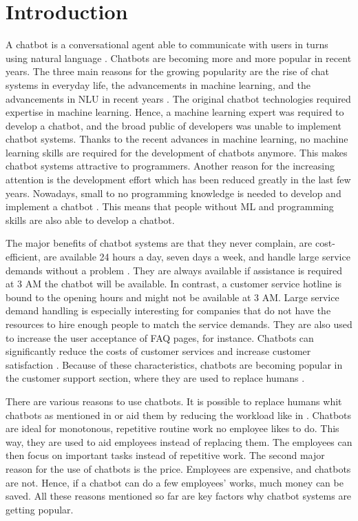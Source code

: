 \section{Introduction} %
A chatbot is a conversational agent able to communicate with users in turns using natural language \cite{evaluateChatbotsShawar2007, shawar2007chatbots, huang2007extracting, gregori2017evaluation}.
Chatbots are becoming more and more popular in recent years.
The three main reasons for the growing popularity are the rise of chat systems in everyday life, the advancements in machine learning, and the advancements in NLU in recent years \cite{braunEvaluatingNLU}.
The original chatbot technologies required expertise in machine learning.
Hence, a machine learning expert was required to develop a chatbot, and the broad public of developers was unable to implement chatbot systems.
Thanks to the recent advances in machine learning, no machine learning skills are required for the development of chatbots anymore.
This makes chatbot systems attractive to programmers. 
Another reason for the increasing attention is the development effort which has been reduced greatly in the last few years.
Nowadays, small to no programming knowledge is needed to develop and implement a chatbot \cite{braunEvaluatingNLU}.
This means that people without ML and programming skills are also able to develop a chatbot.

The major benefits of chatbot systems are that they never complain, are cost-efficient, are available 24 hours a day, seven days a week, and handle large service demands without a problem \cite{singhbuilding}.
They are always available if assistance is required at 3 AM the chatbot will be available. In contrast, a customer service hotline is bound to the opening hours and might not be available at 3 AM.
Large service demand handling is especially interesting for companies that do not have the resources to hire enough people to match the service demands.
They are also used to increase the user acceptance of FAQ pages, for instance.
Chatbots can significantly reduce the costs of customer services and increase customer satisfaction \cite{singhbuilding}. 
Because of these characteristics, chatbots are becoming popular in the customer support section, where they are used to replace humans \cite{GO2019304}.

There are various reasons to use chatbots.
It is possible to replace humans whit chatbots as mentioned in \citet{rahman2017programming} or aid them by reducing the workload like in \citet{deshpande2017survey}.
Chatbots are ideal for monotonous, repetitive routine work no employee likes to do.
This way, they are used to aid employees instead of replacing them.
The employees can then focus on important tasks instead of repetitive work.
The second major reason for the use of chatbots is the price.
Employees are expensive, and chatbots are not.
Hence, if a chatbot can do a few employees' works, much money can be saved.
All these reasons mentioned so far are key factors why chatbot systems are getting popular.

